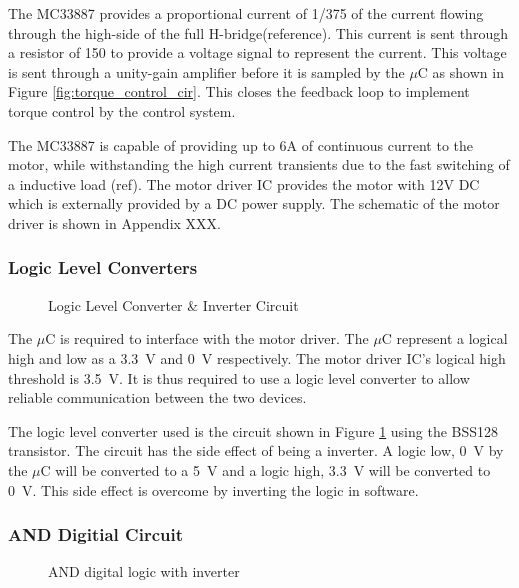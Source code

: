 The MC33887 provides a proportional current of 1/375 of the current flowing through the high-side of the full H-bridge(reference). This current is sent through a resistor of \SI{150}{\Omega} to provide a voltage signal to represent the current. This voltage is sent through a unity-gain amplifier before it is sampled by the $\mu$C as shown in Figure \ref{fig:torque_control_cir}. This closes the feedback loop to implement torque control by the control system.

The MC33887 is capable of providing up to 6A of continuous current to the motor, while withstanding the high current transients due to the fast switching of a inductive load (ref). The motor driver IC provides the motor with 12V DC which is externally provided by a DC power supply. The schematic of the motor driver is shown in Appendix XXX.

\subsubsection{Logic Level Converters}
\begin{figure}[h]
	\centering
	
	\caption{Logic Level Converter \& Inverter Circuit}
	\label{fig:interterCirc}
\end{figure}


The $\mu$C is required to interface with the motor driver. The $\mu$C represent a logical high and low as a \SI{3.3}{V} and \SI{0}{V} respectively. The motor driver IC's logical high threshold is \SI{3.5}{V}. It is thus required to use a logic level converter to allow reliable communication between the two devices.

The logic level converter used is the circuit shown in Figure \ref{fig:interterCirc} using the BSS128 transistor. The circuit has the side effect of being a inverter. A logic low, \SI{0}{V} by the $\mu$C will be converted to a \SI{5}{V} and a logic high, \SI{3.3}{V} will be converted to \SI{0}{V}. This side effect is overcome by inverting the logic in software.


\subsubsection{AND Digitial Circuit}
\begin{figure}[h]
	\centering
	
	\caption{AND digital logic with inverter}
	\label{fig:andCircuit}
\end{figure}

